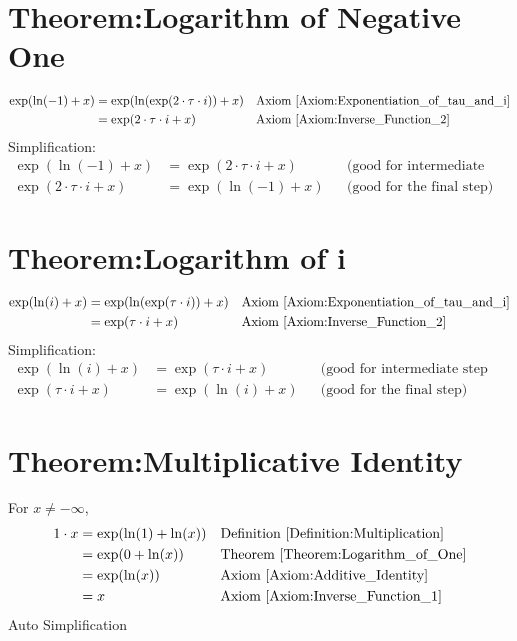\documentclass[12pt,a4paper]{report}
\begin{document}
\section{Theorem:Logarithm of Negative One}
\label{Theorem:Logarithm_of_Negative_One}
\begin{align*}
\exp(\ln(-1) + x)
&= \exp(\ln(\exp(2 \cdot \tau \cdot i)) + x)
&& \text{Axiom \ref{Axiom:Exponentiation_of_tau_and_i}} \\
&= \exp(2 \cdot \tau \cdot i + x)
&& \text{Axiom \ref{Axiom:Inverse_Function_2}} \\
\end{align*}
Simplification:
\begin{align}
\exp(\ln(-1) + x) &= \exp(2 \cdot \tau \cdot i + x) && \text{(good for intermediate step for term cancellation)} \label{Implementation:Logarithm_of_Negative_One_1} \\
\exp(2 \cdot \tau \cdot i + x) &= \exp(\ln(-1) + x) && \text{(good for the final step)} \label{Implementation:Logarithm_of_Negative_One_2}
\end{align}

\section{Theorem:Logarithm of i}
\label{Theorem:Logarithm_of_i}
\begin{align*}
\exp(\ln(i) + x)
&= \exp(\ln(\exp(\tau \cdot i)) + x)
&& \text{Axiom \ref{Axiom:Exponentiation_of_tau_and_i}} \\
&= \exp(\tau \cdot i + x)
&& \text{Axiom \ref{Axiom:Inverse_Function_2}} \\
\end{align*}
Simplification:
\begin{align}
\exp(\ln(i) + x) &= \exp(\tau \cdot i + x) && \text{(good for intermediate step for term cancellation)} \label{Implementation:Logarithm_of_i_1} \\
\exp(\tau \cdot i + x) &= \exp(\ln(i) + x) && \text{(good for the final step)} \label{Implementation:Logarithm_of_i_2}
\end{align}

\section{Theorem:Multiplicative Identity}
\label{Theorem:Multiplicative_Identity}
For $x \neq -\infty$,
\begin{align*}
1 \cdot x
&= \exp(\ln(1) + \ln(x))
&& \text{Definition \ref{Definition:Multiplication}} \\
&= \exp(0 + \ln(x))
&& \text{Theorem \ref{Theorem:Logarithm_of_One}} \\
&= \exp(\ln(x))
&& \text{Axiom \ref{Axiom:Additive_Identity}} \\
&= x
&& \text{Axiom \ref{Axiom:Inverse_Function_1}} \\
\end{align*}
Auto Simplification
\end{document}
